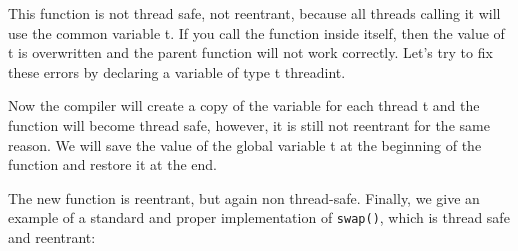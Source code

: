{	\begin{figure}[H]
		
	\end{figure}
	\par This function is not thread safe, not reentrant, because all threads calling it will use the common variable t. If you call the function inside itself, then the value of t is overwritten and the parent function will not work correctly. Let's try to fix these errors by declaring a variable of type t \textunderscore \textunderscore threadint.
	\begin{figure}[H]
		
	\end{figure}
	\par Now the compiler will create a copy of the variable for each thread t and the function will become thread safe, however, it is still not reentrant for the same reason. We will save the value of the global variable t at the beginning of the function and restore it at the end.
	\begin{figure}[H]
		
	\end{figure}
	\par The new function is reentrant, but again non thread-safe. Finally, we give an example of a standard and proper implementation of \texttt{swap()}, which is thread safe and reentrant:
	\begin{figure}[H]
		
	\end{figure}
}